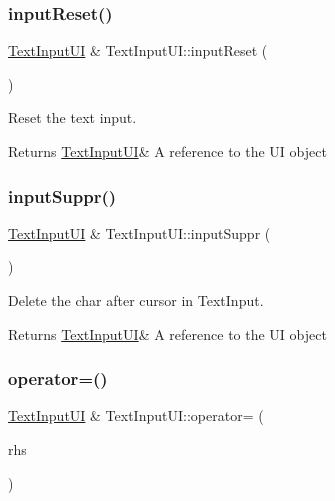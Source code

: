 \subsubsection{\texorpdfstring{input\+Reset()}{inputReset()}}
{\footnotesize\ttfamily \hyperlink{class_text_input_u_i}{Text\+Input\+UI} \& Text\+Input\+U\+I\+::input\+Reset (\begin{DoxyParamCaption}{ }\end{DoxyParamCaption})}



Reset the text input. 

\begin{DoxyReturn}{Returns}
\hyperlink{class_text_input_u_i}{Text\+Input\+UI}\& A reference to the UI object 
\end{DoxyReturn}
\mbox{\label{class_text_input_u_i_ae7f698f14e09df0c41bead64b41f9d8d}} 
\subsubsection{\texorpdfstring{input\+Suppr()}{inputSuppr()}}
{\footnotesize\ttfamily \hyperlink{class_text_input_u_i}{Text\+Input\+UI} \& Text\+Input\+U\+I\+::input\+Suppr (\begin{DoxyParamCaption}{ }\end{DoxyParamCaption})}



Delete the char after cursor in Text\+Input. 

\begin{DoxyReturn}{Returns}
\hyperlink{class_text_input_u_i}{Text\+Input\+UI}\& A reference to the UI object 
\end{DoxyReturn}
\mbox{\label{class_text_input_u_i_a7d1436a384c86575aa7021d89c110964}} 
\subsubsection{\texorpdfstring{operator=()}{operator=()}}
{\footnotesize\ttfamily \hyperlink{class_text_input_u_i}{Text\+Input\+UI} \& Text\+Input\+U\+I\+::operator= (\begin{DoxyParamCaption}\item[{\hyperlink{class_text_input_u_i}{Text\+Input\+UI} const \&}]{rhs }\end{DoxyParamCaption})}



